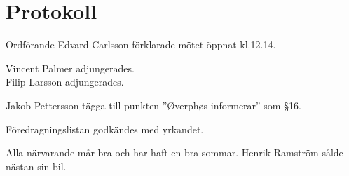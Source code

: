 \documentclass[10pt]{article}
\def\mo{Edvard Carlsson}
\begin{document}
\section*{Protokoll}
\begin{paragrafer}
Ordförande {\mo} förklarade mötet öppnat kl.12.14.

{\valavmo}

{\valavms}

{\valavj}

{\tosg}

Vincent Palmer adjungerades.\\
Filip Larsson adjungerades. 




Jakob Pettersson \ypa tägga till punkten ''Øverphøs informerar'' som \S16.

Föredragningslistan godkändes med yrkandet.

\textit{\ingaprot}

\begin{fyllnadsval} %

\end{fyllnadsval}

\begin{paragrafer}
Alla närvarande mår bra och har haft en bra sommar. Henrik Ramström sålde nästan sin bil. 


\end{paragrafer}
\end{paragrafer}
\end{document}
